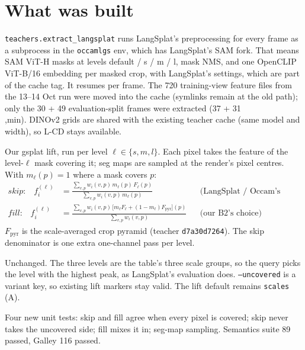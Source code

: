 \documentclass[11pt,a4paper]{article}
\newcommand{\code}[1]{\texttt{\small #1}}
\begin{document}
\section{What was built}
\begin{description}[leftmargin=1.2em,style=nextline,itemsep=2pt]
  \item[Teacher step, \code{--clip-mode langsplat} (cache tag \code{4f4bdb1a08})]
    \code{teachers.extract\_langsplat} runs LangSplat's preprocessing for every frame as a subprocess in the
    \code{occamlgs} env, which has LangSplat's SAM fork. That means SAM ViT-H masks at levels default / s / m / l, mask
    NMS, and one OpenCLIP ViT-B/16 embedding per masked crop, with LangSplat's settings, which are part of the cache tag.
    It resumes per frame. The 720 training-view feature files from the 13--14 Oct run were moved into the cache
    (symlinks remain at the old path); only the 30 + 49 evaluation-split frames were extracted (37 + 31\\,min). DINOv2
    grids are shared with the existing teacher cache (same model and width), so L-CD stays available.
  \item[Lift, \code{--uncovered skip|fill} (\code{lift.lift\_segment\_views})]
    Our gsplat lift, run per level $\ell\in\{s,m,l\}$. Each pixel takes the feature of the level-$\ell$ mask covering
    it; seg maps are sampled at the render's pixel centres. With $m_\ell(p)=1$ where a mask covers $p$:
    \begin{align*}
      \textit{skip:}\quad f_i^{(\ell)} &= \frac{\sum_{v,p} w_i(v,p)\,m_\ell(p)\,F_\ell(p)}{\sum_{v,p} w_i(v,p)\,m_\ell(p)}
        &&\text{(LangSplat / Occam's choice)}\\
      \textit{fill:}\quad f_i^{(\ell)} &= \frac{\sum_{v,p} w_i(v,p)\,\big[m_\ell F_\ell + (1-m_\ell) F_{\text{pyr}}\big](p)}{\sum_{v,p} w_i(v,p)}
        &&\text{(our B2's choice)}
    \end{align*}
    $F_{\text{pyr}}$ is the scale-averaged crop pyramid (teacher \code{d7a30d7264}). The skip denominator is one extra
    one-channel pass per level.
  \item[Table and query] Unchanged. The three levels are the table's three scale groups, so the query picks the level
    with the highest peak, as LangSplat's evaluation does. \code{--uncovered} is a variant key, so existing lift markers
    stay valid. The lift default remains \code{scales} (A).
  \item[Tests] Four new unit tests: skip and fill agree when every pixel is covered; skip never takes the uncovered side;
    fill mixes it in; seg-map sampling. Semantics suite 89 passed, Galley 116 passed.
\end{description}
\end{document}
